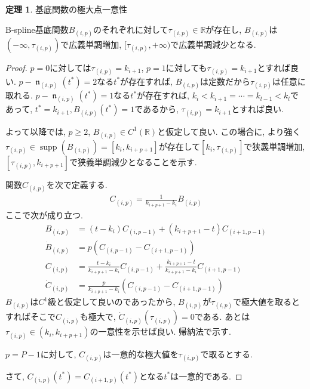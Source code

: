 \documentclass{jsarticle}
\newcommand\setR{\mathbb{R}}
\newcommand\Pare[1]{\left(#1\right)}
\newcommand\Squa[1]{\left[#1\right]}
\DeclareMathOperator{\supp}{supp}
\DeclareMathOperator{\N}{\mathfrak{n}}
\theoremstyle{definition}%
\newtheorem{thm}{定理}
\begin{document}
\begin{screen}
	\begin{thm}
        基底関数の極大点一意性

        B-spline基底関数$B_{(i,p)}$のそれぞれに対して$\tau_{(i,p)}\in \setR$が存在し, $B_{(i,p)}$は$(-\infty, \tau_{(i,p)})$で広義単調増加, $[\tau_{(i,p)},+\infty)$で広義単調減少となる.
	\end{thm}
\end{screen}
\begin{proof}
    $p=0$に対しては$\tau_{(i,p)}=k_{i+1}$, $p=1$に対しても$\tau_{(i,p)}=k_{i+1}$とすれば良い.
    $p-\N_{(i,p)}(t^*)=2$なる$t^*$が存在すれば, $B_{(i,p)}$は定数だから$\tau_{(i,p)}$は任意に取れる.
    $p-\N_{(i,p)}(t^*)=1$なる$t^*$が存在すれば, $k_{i}<k_{i+1}=\cdots=k_{l-1}<k_{l}$であって, $t^*=k_{i+1}, B_{(i,p)}(t^*)=1$であるから, $\tau_{(i,p)}=k_{i+1}$とすれば良い.

    よって以降では, $p\ge 2$, $B_{(i,p)}\in C^1(\setR)$と仮定して良い.
    この場合に, より強く$\tau_{(i,p)}\in \supp(B_{(i,p)})=\Squa{k_{i},k_{i+p+1}}$が存在して$\Squa{k_{i}, \tau_{(i,p)}}$で狭義単調増加, $\Squa{\tau_{(i,p)},k_{i+p+1}}$で狭義単調減少となることを示す.

    関数$C_{(i,p)}$を次で定義する.
    \begin{align}
        C_{(i,p)}
        =\frac{1}{k_{i+p+1}-k_{i}}B_{(i,p)}
    \end{align}
    ここで次が成り立つ.
    \begin{align}
        B_{(i,p)}&=(t-k_{i})C_{(i,p-1)}+(k_{i+p+1}-t)C_{(i+1,p-1)} \\
        \dot{B}_{(i,p)}&=p(C_{(i,p-1)}-C_{(i+1,p-1)}) \\
        C_{(i,p)}&=\frac{t-k_{i}}{k_{i+p+1}-k_{i}}C_{(i,p-1)}+\frac{k_{i+p+1}-t}{k_{i+p+1}-k_{i}}C_{(i+1,p-1)} \\
        \dot{C}_{(i,p)}&=\frac{p}{k_{i+p+1}-k_{i}}\Pare{C_{(i,p-1)}-C_{(i+1,p-1)}}
    \end{align}
    $B_{(i,p)}$は$C^1$級と仮定して良いのであったから, $B_{(i,p)}$が$\tau_{(i,p)}$で極大値を取るとすればそこで$C_{(i,p)}$も極大で, $\dot{C}_{(i,p)}(\tau_{(i,p)})=0$である.
    あとは$\tau_{(i,p)}\in \Pare{k_{i},k_{i+p+1}}$の一意性を示せば良い.
    帰納法で示す.

    $p=P-1$に対して, $C_{(i,p)}$は一意的な極大値を$\tau_{(i,p)}$で取るとする.

    さて, $C_{(i,p)}(t^*)=C_{(i+1,p)}(t^*)$となる$t^*$は一意的である.




\end{proof}
\end{document}
